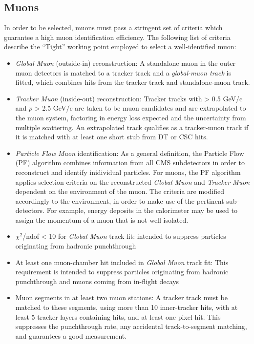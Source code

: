 \subsection{Muons} 
\label{subsec:muon}
In order to be selected, muons must pass a stringent set of criteria which guarantee a high muon identification efficiency. The following list of criteria describe the ``Tight'' working point employed to select a well-identified muon:

\begin{itemize}
  \item \textit{Global Muon} (outside-in) reconstruction: A standalone muon in the outer muon detectors is matched to a tracker track and a \textit{global-muon track} is fitted, which combines hits from the tracker track and standalone-muon track.
  \item \textit{Tracker Muon} (inside-out) reconstruction: Tracker tracks with \pt > 0.5 GeV/c and $p$ > 2.5 GeV/c are taken to be muon candidates and are extrapolated to the muon system, factoring in energy loss expected and the uncertainty from multiple scattering. An extrapolated track qualifies as a tracker-muon track if it is matched with at least one short stub from DT or CSC hits.
  \item \textit{Particle Flow Muon} identification: As a general definition, the Particle Flow (PF) algorithm combines information from all CMS subdetectors in order to reconstruct and identify inidividual particles. For muons, the PF algorithm applies selection criteria on the reconstructed \textit{Global Muon} and \textit{Tracker Muon} dependent on the environment of the muon. The criteria are modified accordingly to the environment, in order to make use of the pertinent sub-detectors. For example, energy deposits in the calorimeter may be used to assign the momentum of a muon that is not well isolated.
  \item $\chi^2$/ndof < 10 for \textit{Global Muon} track fit: intended to suppress particles originating from hadronic punchthrough 
  \item At least one muon-chamber hit included in \textit{Global Muon} track fit: This requirement is intended to suppress particles originating from hadronic punchthrough and muons coming from in-flight decays
  \item Muon segments in at least two muon stations: A tracker track must be matched to these segments, using more than 10 inner-tracker hits, with at least 5 tracker layers containing hits, and at least one pixel hit. This suppresses the punchthrough rate, any accidental track-to-segment matching, and guarantees a good \pt measurement.

\end{itemize}
